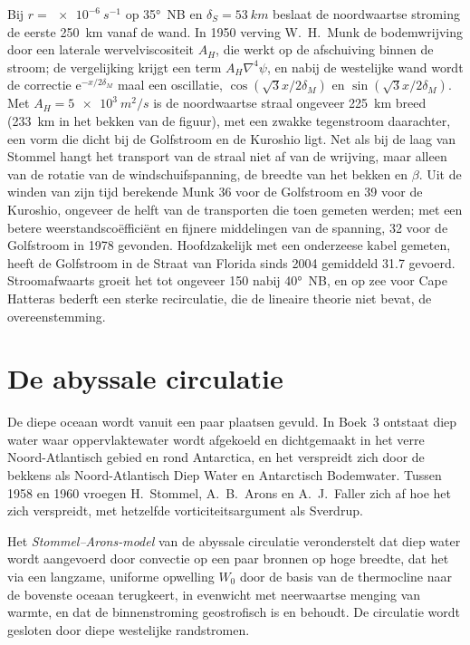 Bij $r = \qty{e-6}{s^{-1}}$ op \ang{35}~NB en $\delta_S = \qty{53}{km}$
beslaat de noordwaartse stroming de eerste \qty{250}{km} vanaf de wand. In 1950
verving W.~H.~Munk de bodemwrijving door een laterale wervelviscositeit $A_H$,
die werkt op de afschuiving binnen de stroom; de vergelijking krijgt een term
$A_H\nabla^4\psi$, en nabij de westelijke wand wordt de correctie
$\mathrm e^{-x/2\delta_M}$ maal een oscillatie, $\cos(\sqrt3x/2\delta_M)$
en $\sin(\sqrt3x/2\delta_M)$. Met $A_H = \qty{5e3}{m^2/s}$ is de noordwaartse
straal ongeveer \qty{225}{km} breed (\qty{233}{km} in het bekken van de figuur),
met een zwakke tegenstroom daarachter, een vorm die dicht bij de Golfstroom en
de Kuroshio ligt. Net als bij de laag van Stommel hangt het transport van de straal niet
af van de wrijving, maar alleen van de rotatie van de windschuifspanning, de breedte van het
bekken en $\beta$. Uit de winden van zijn tijd berekende Munk
\qty{36}{\sverdrup} voor de Golfstroom en \qty{39}{\sverdrup} voor de
Kuroshio, ongeveer de helft van de transporten die toen gemeten werden; met een betere
weerstandscoëfficiënt en fijnere middelingen van de spanning, \qty{32}{\sverdrup}
voor de Golfstroom in 1978 gevonden. Hoofdzakelijk met een onderzeese kabel gemeten, heeft de
Golfstroom in de Straat van Florida sinds 2004 gemiddeld
\qty{31.7}{\sverdrup} gevoerd. Stroomafwaarts groeit het tot ongeveer \qty{150}{\sverdrup} nabij
\ang{40}~NB, en op zee voor Cape Hatteras bederft een sterke recirculatie, die de
lineaire theorie niet bevat, de overeenstemming.

\section{De abyssale circulatie}\label{sec:b3:ocean-dynamics:abyssal}

De diepe oceaan wordt vanuit een paar plaatsen gevuld. In Boek~3 ontstaat diep water waar
oppervlaktewater wordt afgekoeld en dichtgemaakt in het verre Noord-Atlantisch gebied en rond
Antarctica, en het verspreidt zich door de bekkens als Noord-Atlantisch Diep Water en
Antarctisch Bodemwater. Tussen 1958 en 1960
vroegen H.~Stommel, A.~B.~Arons en A.~J.~Faller zich af hoe het zich verspreidt, met
hetzelfde vorticiteitsargument als Sverdrup.

\begin{definition}\label{def:b3:ocean-dynamics:abyssal}
Het \emph{Stommel--Arons-model} van de abyssale
circulatie veronderstelt dat diep water wordt aangevoerd door convectie op een paar
bronnen op hoge breedte, dat het via een langzame, uniforme
opwelling $W_0$ door de basis van de thermocline naar de bovenste oceaan terugkeert, in
evenwicht met neerwaartse menging van warmte, en dat de binnenstroming geostrofisch is en
 behoudt. De circulatie wordt gesloten door diepe westelijke
randstromen.
\end{definition}

